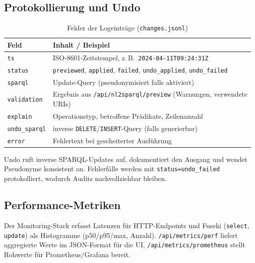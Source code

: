 \subsection{Protokollierung und Undo}
\begin{table}[ht]
  \centering
  \caption{Felder der Logeinträge (\texttt{changes.jsonl})}
  \label{tab:logging-fields}
  \begin{tabular}{p{}p{}}
    \toprule
    \textbf{Feld} & \textbf{Inhalt / Beispiel} \\
    \midrule
    \texttt{ts} & ISO-8601-Zeitstempel, z.\,B.\ \texttt{2024-04-11T09:24:31Z} \\
    \texttt{status} & \texttt{previewed}, \texttt{applied}, \texttt{failed}, \texttt{undo\_applied}, \texttt{undo\_failed} \\
    \texttt{sparql} & Update-Query (pseudonymisiert falls aktiviert) \\
    \texttt{validation} & Ergebnis aus \texttt{/api/nl2sparql/preview} (Warnungen, verwendete URIs) \\
    \texttt{explain} & Operationstyp, betroffene Prädikate, Zeilenanzahl \\
    \texttt{undo\_sparql} & inverse \texttt{DELETE}/\texttt{INSERT}-Query (falls generierbar) \\
    \texttt{error} & Fehlertext bei gescheiterter Ausführung \\
    \bottomrule
  \end{tabular}
\end{table}

Undo ruft inverse SPARQL-Updates auf, dokumentiert den Ausgang und wendet Pseudonyme konsistent an. Fehlerfälle werden mit \texttt{status=undo\_failed} protokolliert, wodurch Audits nachvollziehbar bleiben.

\subsection{Performance-Metriken}
Der Monitoring-Stack erfasst Latenzen für HTTP-Endpoints und Fuseki (\texttt{select}, \texttt{update}) als Histogramme (p50/p95/max, Anzahl). \texttt{/api/metrics/perf} liefert aggregierte Werte im JSON-Format für die UI, \texttt{/api/metrics/prometheus} stellt Rohwerte für Prometheus/Grafana bereit.

